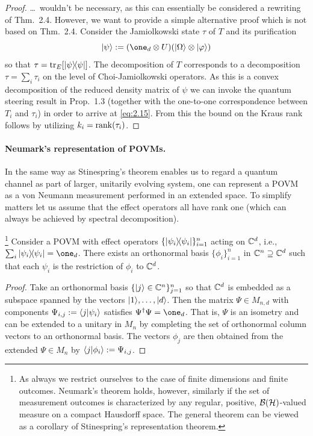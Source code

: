 \documentclass[11pt,a4paper]{article}
\numberwithin{equation}{section}
\theoremstyle{plain}
\theoremstyle{definition}
\begin{document}
\begin{proof}
    \dots\ wouldn't be necessary, as this can essentially be considered a rewriting of
    Thm.~2.4. However, we want to provide a simple alternative proof which is not based
    on Thm.~2.4. Consider the Jamiolkowski state $\tau$ of $T$ and its purification
    \[
        \ket{\psi}:=(\one_d\otimes U)(\ket{\Omega}\otimes \ket{\varphi})
    \]
    so that $\tau=\operatorname{tr}_E[|\psi\rangle\!\langle\psi|]$. The decomposition of $T$ corresponds to a
    decomposition $\tau=\sum_i \tau_i$ on the level of Choi-Jamiolkowski operators. As
    this is a convex decomposition of the reduced density matrix of $\psi$ we can invoke
    the quantum steering result in Prop.~1.3 (together with the one-to-one correspondence
    between $T_i$ and $\tau_i$) in order to arrive at \eqref{eq:2.15}. From this the
    bound on the Kraus rank follows by utilizing $k_i=\operatorname{rank}(\tau_i)$.
\end{proof}

\paragraph{Neumark's representation of POVMs.}
In the same way as Stinespring's theorem enables us to regard a quantum channel as
part of larger, unitarily evolving system, one can represent a POVM as a von Neumann
measurement performed in an extended space. To simplify matters let us assume that
the effect operators all have rank one (which can always be achieved by spectral
decomposition).

\begin{theorem}\footnote{As always we restrict ourselves to the
        case of finite dimensions and finite outcomes. Neumark's theorem holds, however,
        similarly if the set of measurement outcomes is characterized by any regular,
        positive, $\mathcal{B}(\mathcal{H})$-valued measure on a compact Hausdorff space. The general
        theorem can be viewed as a corollary of Stinespring's representation theorem.}
    Consider a POVM with effect operators $\{|\psi_i\rangle\!\langle\psi_i|\}_{i=1}^n$ acting on
    $\mathbb{C}^d$, i.e., $\sum_i \ketbra{\psi_i}{\psi_i} = \one_d$. There exists an orthonormal
    basis $\{\phi_i\}_{i=1}^n$ in $\mathbb{C}^n \supseteq \mathbb{C}^d$ such that each $\psi_i$ is the
    restriction of $\phi_i$ to $\mathbb{C}^d$.
\end{theorem}

\begin{proof}
    Take an orthonormal basis $\{|j\rangle\in\mathbb{C}^n\}_{j=1}^n$ so that $\mathbb{C}^d$ is embedded as
    a subspace spanned by the vectors $|1\rangle,\dots,|d\rangle$. Then the matrix
    $\Psi \in M_{n,d}$ with components $\Psi_{i,j}:=\langle j|\psi_i\rangle$ satisfies
    $\Psi^\dagger \Psi=\one_d$. That is, $\Psi$ is an isometry and can be extended to a
    unitary in $M_n$ by completing the set of orthonormal column vectors to an
    orthonormal basis. The vectors $\phi_j$ are then obtained from the extended
    $\Psi \in M_n$ by $\langle j|\phi_i\rangle:=\Psi_{i,j}$.
\end{proof}
\end{document}
